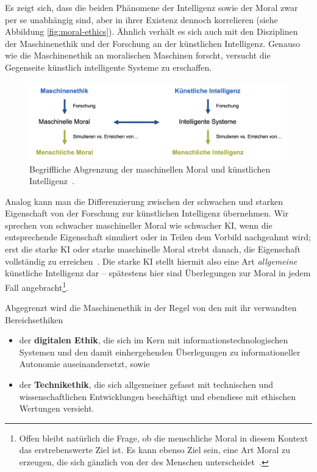 \documentclass[twocolumn, german]{tum-article}
\begin{document}
Es zeigt sich, dass die beiden Phänomene der Intelligenz sowie der Moral zwar per se unabhängig sind, aber in ihrer Existenz dennoch korrelieren (siehe Abbildung \vref{fig:moral-ethics}).
Ähnlich verhält es sich auch mit den Disziplinen der Maschinenethik und der Forschung an der künstlichen Intelligenz.
Genauso wie die Maschinenethik an moralischen Maschinen forscht, versucht die Gegenseite künstlich intelligente Systeme zu erschaffen.

\begin{figure}
	\includegraphics[width=\textwidth]{media/eth-int}
	\caption{Begriffliche Abgrenzung der maschinellen Moral und künstlichen Intelligenz~\cite[S. 17]{bendel-mascheth}.}
	\label{fig:moral-ethics}
\end{figure}

Analog kann man die Differenzierung zwischen der schwachen und starken Eigenschaft von der Forschung zur künstlichen Intelligenz übernehmen.
Wir sprechen von schwacher maschineller Moral wie schwacher KI, wenn die entsprechende Eigenschaft simuliert oder in Teilen dem Vorbild nachgeahmt wird; erst die starke KI oder starke maschinelle Moral strebt danach, die Eigenschaft vollständig zu erreichen~\cite[S. 17]{bendel-mascheth}.
Die starke KI stellt hiermit also eine Art \emph{allgemeine} künstliche Intelligenz dar -- spätestens hier sind Überlegungen zur Moral in jedem Fall angebracht\footnote{Offen bleibt natürlich die Frage, ob die menschliche Moral in diesem Kontext das erstrebenswerte Ziel ist. Es kann ebenso Ziel sein, eine Art \glqq Moral\grqq{} zu erzeugen, die sich gänzlich von der des Menschen unterscheidet~\cite[S. 23]{bendel-mascheth}.}.

Abgegrenzt wird die Maschinenethik in der Regel von den mit ihr verwandten Bereichsethiken
\begin{itemize}
	\item der \textbf{digitalen Ethik}, die sich im Kern mit informationstechnologischen Systemen und den damit einhergehenden Überlegungen zu informationeller Autonomie auseinandersetzt, sowie
	\item der \textbf{Technikethik}, die sich allgemeiner gefasst mit technischen und wissenschaftlichen Entwicklungen beschäftigt und ebendiese mit ethischen Wertungen versieht.
\end{itemize}
\end{document}
